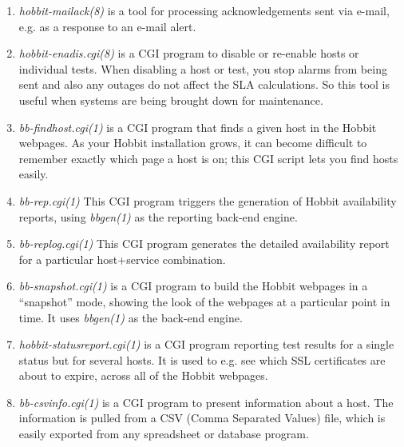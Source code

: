 \begin{enumerate}
 \item \emph{hobbit-mailack(8)}
 is a tool for processing acknowledgements sent via e-mail, e.g. as a response to an e-mail alert. 


 \item \emph{hobbit-enadis.cgi(8)}
 is a CGI program to disable or re-enable hosts or individual
 tests. When disabling a host or test, you stop alarms from being sent
 and also any outages do not affect the SLA calculations. So this tool
 is useful when systems are being brought down for maintenance. 



 \item \emph{bb-findhost.cgi(1)}
 is a CGI program that finds a given host in the Hobbit webpages. As
 your Hobbit installation grows, it can become difficult to remember
 exactly which page a host is on; this CGI script lets you find hosts
 easily. 



 \item \emph{bb-rep.cgi(1)} This CGI program triggers the generation of Hobbit availability reports, using \emph{bbgen(1)}
 as the reporting back-end engine. 


 \item \emph{bb-replog.cgi(1)} This CGI program generates the detailed availability report for a particular host+service combination. 


 \item \emph{bb-snapshot.cgi(1)} is a CGI program to build the Hobbit
 webpages in a ``snapshot'' mode, showing the look of the webpages at
 a particular point in time. It uses \emph{bbgen(1)} as the back-end
 engine. 



 \item \emph{hobbit-statusreport.cgi(1)} is a CGI program reporting test
 results for a single status but for several hosts. It is used to
 e.g. see which SSL certificates are about to expire, across all of
 the Hobbit webpages. 



 \item \emph{bb-csvinfo.cgi(1)}
 is a CGI program to present information about a host. The information
 is pulled from a CSV (Comma Separated Values) file, which is easily
 exported from any spreadsheet or database program. 

\end{enumerate}

 
 

